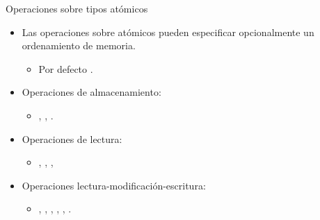 \begin{frame}[t]{Operaciones sobre tipos atómicos}
\begin{itemize}
  \item Las operaciones sobre atómicos pueden especificar opcionalmente un ordenamiento de memoria.
    \begin{itemize}
      \item Por defecto .
    \end{itemize}
  \item Operaciones de almacenamiento:
    \begin{itemize}
      \item {}, , .
    \end{itemize}
  \item Operaciones de lectura:
    \begin{itemize}
      \item {}, , , 
    \end{itemize}
  \item Operaciones lectura-modificación-escritura:
    \begin{itemize}
      \item {}, , , , , .
    \end{itemize}
\end{itemize}
\end{frame}

